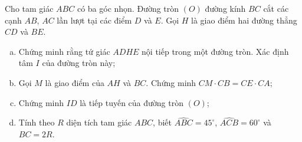  
\begin{ex}%
Cho tam giác $ABC$ có ba góc nhọn. Đường tròn $(O)$ đường kính $BC$ cắt các cạnh $AB$, $AC$ lần lượt tại các điểm $D$ và $E$. Gọi $H$ là giao điểm hai đường thẳng $CD$ và $BE$.
\begin{enumerate}[a)]
\item Chứng minh rằng tứ giác $ADHE$ nội tiếp trong một đường tròn. Xác định tâm $I$ của đường tròn này;
\item Gọi $M$ là giao điểm của $AH$ và $BC$. Chứng minh $CM\cdot CB= CE\cdot CA$;
\item Chứng minh $ID$ là tiếp tuyến của đường tròn $(O)$;
\item Tính theo $R$ diện tích tam giác $ABC$, biết $\widehat{ABC}=45^\circ$, $\widehat{ACB}=60^\circ$ và $BC=2R$.
\end{enumerate}
\end{ex}
